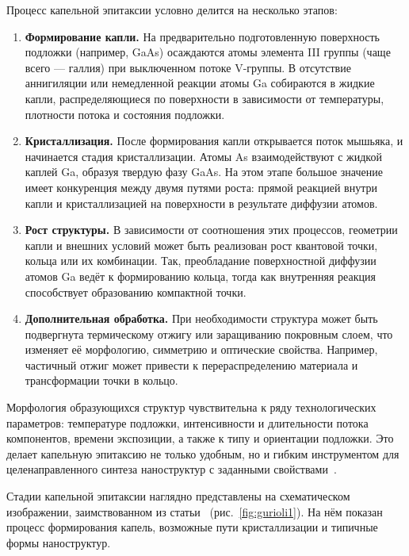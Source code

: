 \documentclass[14pt,oneside]{extarticle}
\begin{document}
Процесс капельной эпитаксии условно делится на несколько этапов:

\begin{enumerate}
    \item \textbf{Формирование капли.} На предварительно подготовленную поверхность подложки (например, GaAs) осаждаются атомы элемента III группы (чаще всего — галлия) при выключенном потоке V-группы. В отсутствие аннигиляции или немедленной реакции атомы Ga собираются в жидкие капли, распределяющиеся по поверхности в зависимости от температуры, плотности потока и состояния подложки.
    
    \item \textbf{Кристаллизация.} После формирования капли открывается поток мышьяка, и начинается стадия кристаллизации. Атомы As взаимодействуют с жидкой каплей Ga, образуя твердую фазу GaAs. На этом этапе большое значение имеет конкуренция между двумя путями роста: прямой реакцией внутри капли и кристаллизацией на поверхности в результате диффузии атомов.
    
    \item \textbf{Рост структуры.} В зависимости от соотношения этих процессов, геометрии капли и внешних условий может быть реализован рост квантовой точки, кольца или их комбинации. Так, преобладание поверхностной диффузии атомов Ga ведёт к формированию кольца, тогда как внутренняя реакция способствует образованию компактной точки.
    
    \item \textbf{Дополнительная обработка.} При необходимости структура может быть подвергнута термическому отжигу или заращиванию покровным слоем, что изменяет её морфологию, симметрию и оптические свойства. Например, частичный отжиг может привести к перераспределению материала и трансформации точки в кольцо.
\end{enumerate}

Морфология образующихся структур чувствительна к ряду технологических параметров: температуре подложки, интенсивности и длительности потока компонентов, времени экспозиции, а также к типу и ориентации подложки. Это делает капельную эпитаксию не только удобным, но и гибким инструментом для целенаправленного синтеза наноструктур с заданными свойствами~\cite{sibirmovskiy2014}.

Стадии капельной эпитаксии наглядно представлены на схематическом изображении, заимствованном из статьи~\cite{gurioli2021} (рис.~\ref{fig:gurioli1}). На нём показан процесс формирования капель, возможные пути кристаллизации и типичные формы наноструктур.
\end{document}
